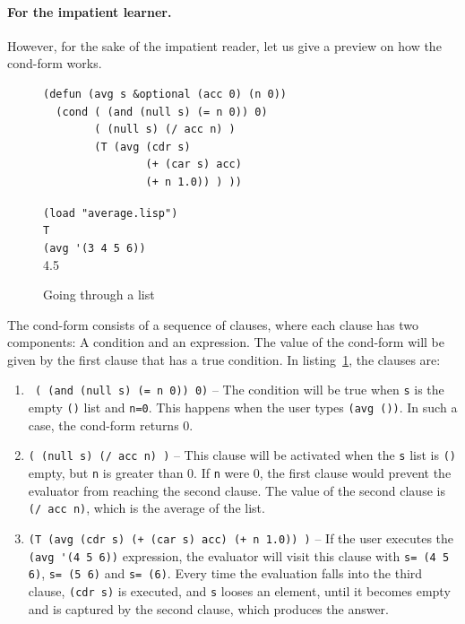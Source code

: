 \documentclass[a4paper,12pt]{book}
\newenvironment{fmpage}[1]
           {\begin{lrbox}{\fmbox}\begin{minipage}{#1}}
           {\end{minipage}\end{lrbox}\fbox{\usebox{\fmbox}}}
\begin{document}
\paragraph{For the impatient learner.}
However, for the sake of the impatient reader,
let us give a preview on
how the cond-form works.

\begin{figure}[!h]
\begin{fmpage}{0.9\textwidth}
\begin{verbatim}
(defun (avg s &optional (acc 0) (n 0))
  (cond ( (and (null s) (= n 0)) 0)
        ( (null s) (/ acc n) )
        (T (avg (cdr s) 
                (+ (car s) acc) 
                (+ n 1.0)) ) ))
\end{verbatim}
\end{fmpage}

\begin{fmpage}{0.9\textwidth}
\verb|(load "average.lisp")|\\
\verb|T|\\
\verb|(avg '(3 4 5 6))|\\
4.5
\end{fmpage}
\caption{Going through a list}
\label{going-through-a-list}
\end{figure}

The cond-form consists of a sequence
of clauses, where each clause has two
components: A condition and an expression.
The value of the cond-form will be given by
the first clause that has a true condition.
In listing~\ref{going-through-a-list}, the
clauses are:
\begin{enumerate}
\item \verb| ( (and (null s) (= n 0)) 0)| --
The condition will be true when \verb|s| is the empty
\verb|()| list and \verb|n=0|. This happens when the
user types \verb|(avg ())|. In such a case, the cond-form
returns 0.
\item \verb|( (null s) (/ acc n) )| -- This clause
will be activated when the \verb|s| list is
\verb|()| empty, but \verb|n| is greater than 0.
If \verb|n| were 0, the first clause would prevent
the evaluator from reaching the second clause. The
value of the second clause is \verb|(/ acc n)|,
which is the average of the list.
\item \verb|(T (avg (cdr s) (+ (car s) acc) (+ n 1.0)) )| --
If the user executes the \verb|(avg '(4 5 6))| expression,
the evaluator will visit this clause with \verb|s= (4 5 6)|,
\verb|s= (5 6)| and \verb|s= (6)|. Every time the evaluation
falls into the third clause, \verb|(cdr s)| is executed, and
\verb|s| looses an element, until it becomes empty and is
captured by the second clause, which produces the answer.
\end{enumerate}
\end{document}
